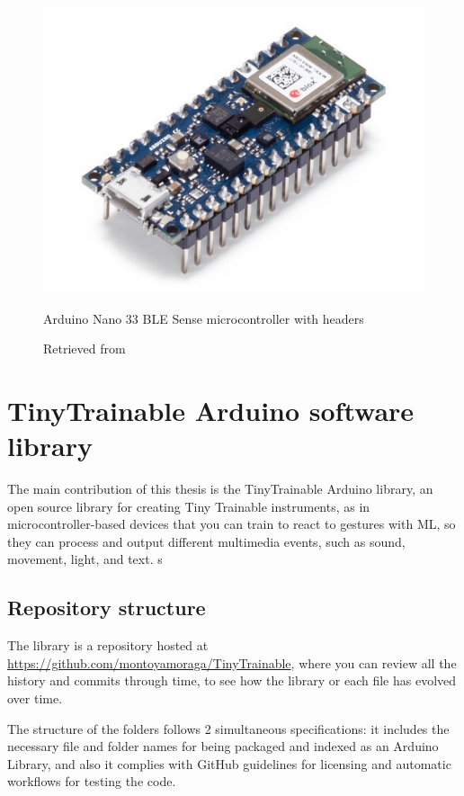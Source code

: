 \begin{figure}[ht]
  \centering
  \includegraphics[width=0.75\linewidth,height=0.25\textheight,keepaspectratio]{images/materials-arduino-nano-33-ble-sense.jpg}
  \caption{Arduino Nano 33 \acrshort{BLE} Sense microcontroller with headers}
  \caption*{Retrieved from \cite{website-materials-arduino-nano-33-ble-sense}}
  \label{fig:materials-arduino-nano-33-ble-sense}
\end{figure}

\section{TinyTrainable Arduino software library}

The main contribution of this thesis is the TinyTrainable Arduino library, an open source library for creating Tiny Trainable instruments, as in microcontroller-based devices that you can train to react to gestures with \acrshort{ML}, so they can process and output different multimedia events, such as sound, movement, light, and text.
s
\subsection{Repository structure}

The library is a repository hosted at \url{https://github.com/montoyamoraga/TinyTrainable}, where you can review all the history and commits through time, to see how the library or each file has evolved over time.

The structure of the folders follows 2 simultaneous specifications: it includes the necessary file and folder names for being packaged and indexed as an Arduino Library, and also it complies with GitHub guidelines for licensing and automatic workflows for testing the code.

